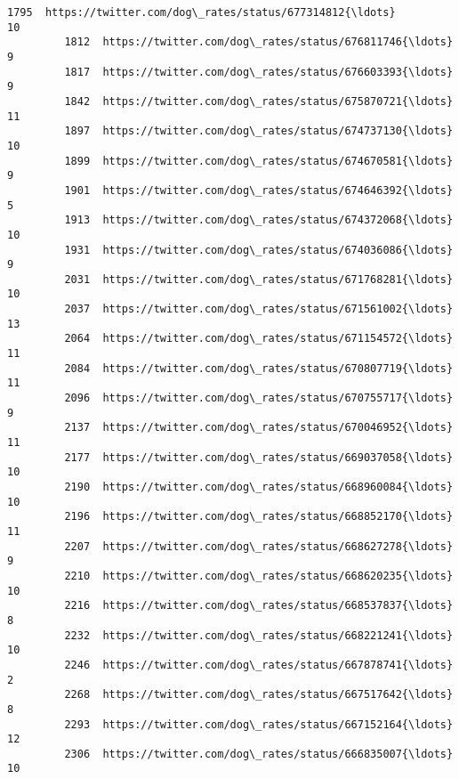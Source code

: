 \documentclass[11pt]{article}
\begin{document}
\begin{Verbatim}[commandchars=\\\{\}]
         1795  https://twitter.com/dog\_rates/status/677314812{\ldots}                10   
         1812  https://twitter.com/dog\_rates/status/676811746{\ldots}                 9   
         1817  https://twitter.com/dog\_rates/status/676603393{\ldots}                 9   
         1842  https://twitter.com/dog\_rates/status/675870721{\ldots}                11   
         1897  https://twitter.com/dog\_rates/status/674737130{\ldots}                10   
         1899  https://twitter.com/dog\_rates/status/674670581{\ldots}                 9   
         1901  https://twitter.com/dog\_rates/status/674646392{\ldots}                 5   
         1913  https://twitter.com/dog\_rates/status/674372068{\ldots}                10   
         1931  https://twitter.com/dog\_rates/status/674036086{\ldots}                 9   
         2031  https://twitter.com/dog\_rates/status/671768281{\ldots}                10   
         2037  https://twitter.com/dog\_rates/status/671561002{\ldots}                13   
         2064  https://twitter.com/dog\_rates/status/671154572{\ldots}                11   
         2084  https://twitter.com/dog\_rates/status/670807719{\ldots}                11   
         2096  https://twitter.com/dog\_rates/status/670755717{\ldots}                 9   
         2137  https://twitter.com/dog\_rates/status/670046952{\ldots}                11   
         2177  https://twitter.com/dog\_rates/status/669037058{\ldots}                10   
         2190  https://twitter.com/dog\_rates/status/668960084{\ldots}                10   
         2196  https://twitter.com/dog\_rates/status/668852170{\ldots}                11   
         2207  https://twitter.com/dog\_rates/status/668627278{\ldots}                 9   
         2210  https://twitter.com/dog\_rates/status/668620235{\ldots}                10   
         2216  https://twitter.com/dog\_rates/status/668537837{\ldots}                 8   
         2232  https://twitter.com/dog\_rates/status/668221241{\ldots}                10   
         2246  https://twitter.com/dog\_rates/status/667878741{\ldots}                 2   
         2268  https://twitter.com/dog\_rates/status/667517642{\ldots}                 8   
         2293  https://twitter.com/dog\_rates/status/667152164{\ldots}                12   
         2306  https://twitter.com/dog\_rates/status/666835007{\ldots}                10   
         

\end{Verbatim}
\end{document}
